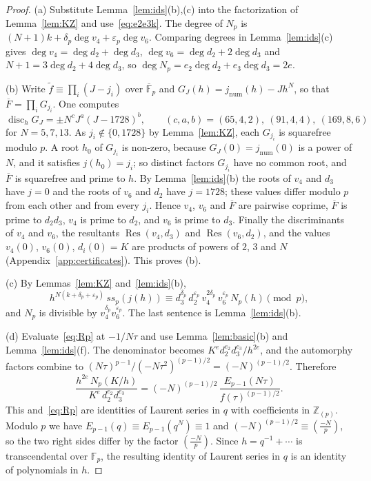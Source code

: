 \documentclass[11pt,a4paper]{article}
\theoremstyle{definition}
\theoremstyle{remark}
\newcommand{\F}{\mathbb{F}}
\newcommand{\Z}{\mathbb{Z}}
\newcommand{\Fpbar}{\overline{\F}_p}
\newcommand{\leg}[2]{\left(\frac{#1}{#2}\right)}
\newcommand{\Res}{\operatorname{Res}}
\newcommand{\disc}{\operatorname{disc}}
\newcommand{\ssp}{\mathit{ss}_p}
\newcommand{\Zp}{\Z_{(p)}}
\numberwithin{equation}{section}
\begin{document}
\begin{proof}
(a) Substitute Lemma~\ref{lem:ids}(b),(c) into the factorization of
Lemma~\ref{lem:KZ} and use~\eqref{eq:e2e3k}. The degree of $N_p$ is
$(N+1)k+\delta_p\deg v_4+\varepsilon_p\deg v_6$. Comparing degrees in
Lemma~\ref{lem:ids}(c) gives $\deg v_4=\deg d_2+\deg d_3$,
$\deg v_6=\deg d_2+2\deg d_3$ and $N+1=3\deg d_2+4\deg d_3$, so
$\deg N_p=e_2\deg d_2+e_3\deg d_3=2e$.

(b) Write $\tilde f\equiv\prod_i(J-j_i)$ over $\Fpbar$ and
$G_J(h)=j_{\mathrm{num}}(h)-Jh^N$, so that $\overline F=\prod_iG_{j_i}$. One
computes
\begin{equation}\label{eq:disc}
\disc_hG_J=\pm N^{c}J^{a}(J-1728)^{b},\qquad
(c,a,b)=(65,4,2),\ (91,4,4),\ (169,8,6)
\end{equation}
for $N=5,7,13$. As $j_i\notin\{0,1728\}$ by Lemma~\ref{lem:KZ}, each $G_{j_i}$
is squarefree modulo $p$. A root $h_0$ of $G_{j_i}$ is non-zero, because
$G_J(0)=j_{\mathrm{num}}(0)$ is a power of $N$, and it satisfies
$j(h_0)=j_i$; so distinct factors $G_{j_i}$ have no common root, and
$\overline F$ is squarefree and prime to $h$. By Lemma~\ref{lem:ids}(b) the
roots of $v_4$ and $d_3$ have $j=0$ and the roots of $v_6$ and $d_2$ have
$j=1728$; these values differ modulo $p$ from each other and from every
$j_i$. Hence $v_4$, $v_6$ and $\overline F$ are pairwise coprime,
$\overline F$ is prime to $d_2d_3$, $v_4$ is prime to $d_2$, and $v_6$ is
prime to $d_3$. Finally the discriminants of $v_4$ and $v_6$, the resultants
$\Res(v_4,d_3)$ and $\Res(v_6,d_2)$, and the values $v_4(0)$, $v_6(0)$,
$d_i(0)=K$ are products of powers of $2$, $3$ and $N$
(Appendix~\ref{app:certificates}). This proves (b).

(c) By Lemmas~\ref{lem:KZ} and~\ref{lem:ids}(b),
\[
h^{N(k+\delta_p+\varepsilon_p)}\,\ssp(j(h))
\equiv d_3^{\delta_p}\,d_2^{\varepsilon_p}\,v_4^{2\delta_p}\,v_6^{\varepsilon_p}\,N_p(h)
\pmod p ,
\]
and $N_p$ is divisible by $v_4^{\delta_p}v_6^{\varepsilon_p}$. The last
sentence is Lemma~\ref{lem:ids}(b).

(d) Evaluate~\eqref{eq:Rp} at $-1/N\tau$ and use Lemma~\ref{lem:basic}(b) and
Lemma~\ref{lem:ids}(f). The denominator becomes
$K^{e}d_2^{e_2}d_3^{e_3}/h^{2e}$, and the automorphy factors combine to
$(N\tau)^{p-1}/(-N\tau^2)^{(p-1)/2}=(-N)^{(p-1)/2}$. Therefore
\[
\frac{h^{2e}\,N_p(K/h)}{K^e\,d_2^{e_2}d_3^{e_3}}
=(-N)^{(p-1)/2}\,\frac{E_{p-1}(N\tau)}{f(\tau)^{(p-1)/2}} .
\]
This and~\eqref{eq:Rp} are identities of Laurent series in $q$ with
coefficients in $\Zp$. Modulo $p$ we have
$E_{p-1}(q)\equiv E_{p-1}(q^N)\equiv1$ and
$(-N)^{(p-1)/2}\equiv\leg{-N}{p}$, so the two right sides differ by the factor
$\leg{-N}{p}$. Since $h=q^{-1}+\cdots$ is transcendental over $\F_p$, the
resulting identity of Laurent series in $q$ is an identity of polynomials in
$h$.
\end{proof}
\end{document}
